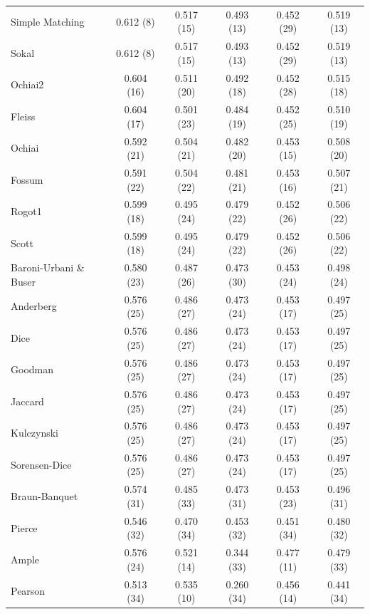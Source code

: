 \begin{table}[t]
{\begin{tabular}{lccccc}
Simple Matching & 0.612 (8) & 0.517 (15) & 0.493 (13) & 0.452 (29) & 0.519 (13) \\
Sokal & 0.612 (8) & 0.517 (15) & 0.493 (13) & 0.452 (29) & 0.519 (13) \\
Ochiai2 & 0.604 (16) & 0.511 (20) & 0.492 (18) & 0.452 (28) & 0.515 (18) \\
Fleiss & 0.604 (17) & 0.501 (23) & 0.484 (19) & 0.452 (25) & 0.510 (19) \\
Ochiai & 0.592 (21) & 0.504 (21) & 0.482 (20) & 0.453 (15) & 0.508 (20) \\
Fossum & 0.591 (22) & 0.504 (22) & 0.481 (21) & 0.453 (16) & 0.507 (21) \\
Rogot1 & 0.599 (18) & 0.495 (24) & 0.479 (22) & 0.452 (26) & 0.506 (22) \\
Scott & 0.599 (18) & 0.495 (24) & 0.479 (22) & 0.452 (26) & 0.506 (22) \\
Baroni-Urbani \& Buser & 0.580 (23) & 0.487 (26) & 0.473 (30) & 0.453 (24) & 0.498 (24) \\
Anderberg & 0.576 (25) & 0.486 (27) & 0.473 (24) & 0.453 (17) & 0.497 (25) \\
Dice & 0.576 (25) & 0.486 (27) & 0.473 (24) & 0.453 (17) & 0.497 (25) \\
Goodman & 0.576 (25) & 0.486 (27) & 0.473 (24) & 0.453 (17) & 0.497 (25) \\
Jaccard & 0.576 (25) & 0.486 (27) & 0.473 (24) & 0.453 (17) & 0.497 (25) \\
Kulczynski & 0.576 (25) & 0.486 (27) & 0.473 (24) & 0.453 (17) & 0.497 (25) \\
Sorensen-Dice & 0.576 (25) & 0.486 (27) & 0.473 (24) & 0.453 (17) & 0.497 (25) \\
Braun-Banquet & 0.574 (31) & 0.485 (33) & 0.473 (31) & 0.453 (23) & 0.496 (31) \\
Pierce & 0.546 (32) & 0.470 (34) & 0.453 (32) & 0.451 (34) & 0.480 (32) \\
Ample & 0.576 (24) & 0.521 (14) & 0.344 (33) & 0.477 (11) & 0.479 (33) \\
Pearson & 0.513 (34) & 0.535 (10) & 0.260 (34) & 0.456 (14) & 0.441 (34) \\
\bottomrule
\end{tabular}
}
\end{table}
